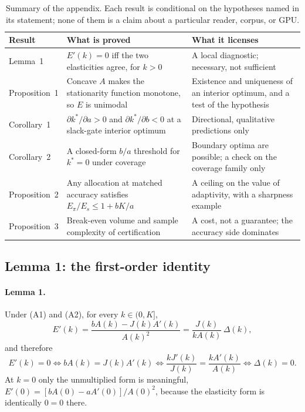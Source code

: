 \begin{table}[pos=htbp]
  \centering
  \caption{Summary of the appendix. Each result is conditional on the
  hypotheses named in its statement; none of them is a claim about a particular
  reader, corpus, or GPU.}
  \label{tab:theorymap}
  \footnotesize
  \setlength{\tabcolsep}{4pt}
  \begin{tabular}{@{}>{\raggedright\arraybackslash}p{1.9cm}>{\raggedright\arraybackslash}p{7.4cm}>{\raggedright\arraybackslash}p{5.0cm}@{}}
    \toprule
    \textbf{Result} & \textbf{What is proved} & \textbf{What it licenses} \\
    \midrule
    Lemma~1 & $E'(k)=0$ iff the two elasticities agree, for $k>0$ &
    A local diagnostic; necessary, not sufficient \\
    Proposition~1 & Concave $A$ makes the stationarity function monotone, so $E$
    is unimodal & Existence and uniqueness of an interior optimum, and a test of
    the hypothesis \\
    Corollary~1 & $\partial k^{*}/\partial a>0$ and $\partial k^{*}/\partial b<0$
    at a slack-gate interior optimum & Directional, qualitative predictions only \\
    Corollary~2 & A closed-form $b/a$ threshold for $k^{*}=0$ under coverage &
    Boundary optima are possible; a check on the coverage family only \\
    Proposition~2 & Any allocation at matched accuracy satisfies
    $E_{\pi}/E_{s}\le 1+bK/a$ & A ceiling on the value of adaptivity, with a
    sharpness example \\
    Proposition~3 & Break-even volume and sample complexity of certification &
    A cost, not a guarantee; the accuracy side dominates \\
    \bottomrule
  \end{tabular}
\end{table}

\subsection{Lemma 1: the first-order identity}\label{app:lemma1}

\paragraph{Lemma 1.} Under (A1) and (A2), for every $k\in(0,K]$,
\begin{equation}\label{app:eq:identity}
  E'(k)=\frac{bA(k)-J(k)A'(k)}{A(k)^{2}}
  =\frac{J(k)}{kA(k)}\,\Delta(k),
\end{equation}
and therefore
\begin{equation}\label{app:eq:identity-iff}
  E'(k)=0
  \iff
  bA(k)=J(k)A'(k)
  \iff
  \frac{kJ'(k)}{J(k)}=\frac{kA'(k)}{A(k)}
  \iff
  \Delta(k)=0 .
\end{equation}
At $k=0$ only the unmultiplied form is meaningful,
$E'(0)=[bA(0)-aA'(0)]/A(0)^{2}$, because the elasticity form is identically
$0=0$ there.


